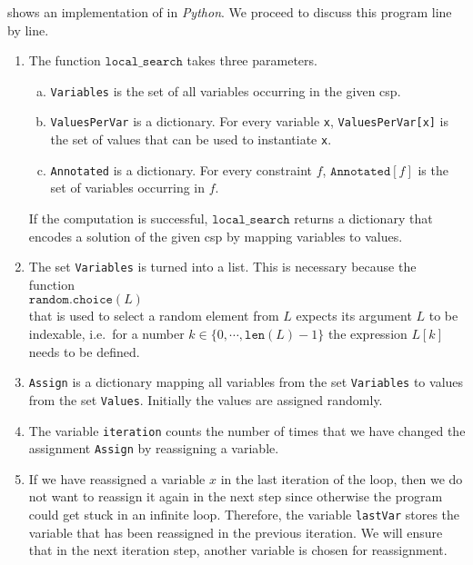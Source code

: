  shows an implementation of  in \textsl{Python}.  We
proceed to discuss this program line by line.
\begin{enumerate}
\item The function $\texttt{local\_search}$ takes three parameters.  
      \begin{enumerate}[(a)]
      \item \texttt{Variables} is the set of all variables occurring in the given \ac{csp}.
      \item \texttt{ValuesPerVar} is a dictionary.  For every variable \texttt{x}, \texttt{ValuesPerVar[x]} is
            the set of values that can be used to instantiate \texttt{x}.
      \item \texttt{Annotated} is a dictionary.  For every constraint $f$, $\texttt{Annotated}[f]$ is the set
            of variables occurring in $f$.
      \end{enumerate}
      If the computation is successful, $\texttt{local\_search}$ returns a dictionary that encodes a solution of the
      given \ac{csp} by mapping variables to values.
\item The set \texttt{Variables} is turned into a list.  This is necessary because the function
      \\[0.2cm]
      \hspace*{1.3cm}
      $\texttt{random.choice}(L)$
      \\[0.2cm]
      that is used to select a random element from $L$ expects its argument $L$ to be indexable, i.e.~for
      a number $k \in \{0, \cdots, \texttt{len}(L)-1\}$ the expression $L[k]$ needs to be defined.
\item \texttt{Assign} is a dictionary mapping all variables from the set \texttt{Variables} to values from the
      set \texttt{Values}.  Initially the values are assigned randomly.
\item The variable \texttt{iteration} counts the number of times that we have changed the assignment
      \texttt{Assign} by reassigning a variable.
\item If we have reassigned a variable $x$ in the last iteration of the loop, then we do not want to reassign
      it again in the next step since otherwise the program could get stuck in an infinite loop.  Therefore,
      the variable \texttt{lastVar} stores the variable that has been reassigned in the previous iteration.
      We will ensure that in the next iteration step, another variable is chosen for reassignment.

\end{enumerate}
